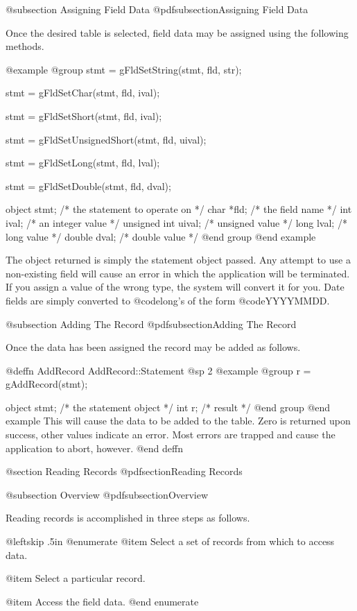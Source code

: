 @subsection Assigning Field Data
@pdfsubsection{Assigning Field Data}

Once the desired table is selected, field data may be assigned using the
following methods.

@example
@group
stmt = gFldSetString(stmt, fld, str);

stmt = gFldSetChar(stmt, fld, ival);

stmt = gFldSetShort(stmt, fld, ival);

stmt = gFldSetUnsignedShort(stmt, fld, uival);

stmt = gFldSetLong(stmt, fld, lval);

stmt = gFldSetDouble(stmt, fld, dval);


object  stmt;   /*  the statement to operate on  */
char    *fld;   /*  the field name               */
int     ival;   /*  an integer value             */
unsigned int uival;  /*  unsigned value          */
long    lval;   /*  long value                   */
double  dval;   /*  double value                 */
@end group
@end example

The object returned is simply the statement object passed.  Any attempt
to use a non-existing field will cause an error in which the application
will be terminated.  If you assign a value of the wrong type, the system
will convert it for you.  Date fields are simply converted to @code{long}'s
of the form @code{YYYYMMDD}.

@subsection Adding The Record
@pdfsubsection{Adding The Record}

Once the data has been assigned the record may be added as follows.

@deffn {AddRecord}  AddRecord::Statement
@sp 2
@example
@group
r = gAddRecord(stmt);

object  stmt;   /*  the statement object  */
int     r;      /*  result                */
@end group
@end example
This will cause the data to be added to the table.  Zero is returned
upon success, other values indicate an error.  Most errors are trapped
and cause the application to abort, however.
@end deffn

@section Reading Records
@pdfsection{Reading Records}

@subsection Overview
@pdfsubsection{Overview}

Reading records is accomplished in three steps as follows.

{@leftskip .5in
@enumerate
@item
Select a set of records from which to access data.

@item
Select a particular record.

@item
Access the field data.
@end enumerate
}

